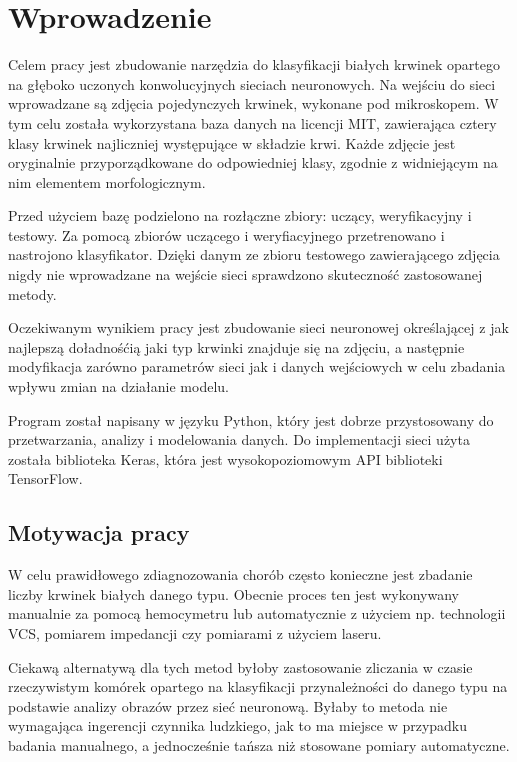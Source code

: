 \chapter{Wprowadzenie}
\label{cha:wprowadzenie}

Celem pracy jest zbudowanie narzędzia do klasyfikacji białych krwinek opartego na głęboko uczonych konwolucyjnych sieciach neuronowych. Na wejściu do sieci wprowadzane są zdjęcia pojedynczych krwinek, wykonane pod mikroskopem. W tym celu została wykorzystana baza danych na licencji MIT, zawierająca cztery klasy krwinek najliczniej występujące w składzie krwi. Każde zdjęcie jest oryginalnie przyporządkowane do odpowiedniej klasy, zgodnie z widniejącym na nim elementem morfologicznym. 

Przed użyciem bazę podzielono na rozłączne zbiory: uczący, weryfikacyjny i testowy. Za pomocą zbiorów uczącego i weryfiacyjnego przetrenowano i nastrojono klasyfikator. Dzięki danym ze zbioru testowego zawierającego zdjęcia nigdy nie wprowadzane na wejście sieci sprawdzono skuteczność zastosowanej metody.

Oczekiwanym wynikiem pracy jest zbudowanie sieci neuronowej określającej z jak najlepszą doładnośćią jaki typ krwinki znajduje się na zdjęciu, a następnie modyfikacja zarówno parametrów sieci jak i danych wejściowych w celu zbadania wpływu zmian na działanie modelu.

Program został napisany w języku Python, który jest dobrze przystosowany do przetwarzania, analizy i modelowania danych. Do implementacji sieci użyta została biblioteka Keras, która jest wysokopoziomowym API biblioteki TensorFlow.

\section{Motywacja pracy}
\label{sec:motywacja_pracy}

W celu prawidłowego zdiagnozowania chorób często konieczne jest zbadanie liczby krwinek białych danego typu. Obecnie proces ten jest wykonywany manualnie za pomocą hemocymetru lub automatycznie z użyciem np. technologii VCS, pomiarem impedancji czy pomiarami z użyciem laseru.

Ciekawą alternatywą dla tych metod byłoby zastosowanie zliczania w czasie rzeczywistym komórek opartego na klasyfikacji przynależności do danego typu na podstawie analizy obrazów przez sieć neuronową. Byłaby to metoda nie wymagająca ingerencji czynnika ludzkiego, jak to ma miejsce w przypadku badania manualnego, a jednocześnie tańsza niż stosowane pomiary automatyczne.

